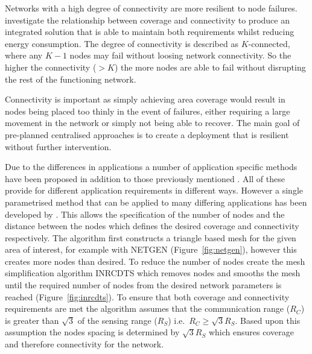 \documentclass[authoryearcitations]{UoYCSproject}
\begin{document}
Networks with a high degree of connectivity are more resilient to node failures.  investigate the relationship between coverage and connectivity to produce an integrated solution that is able to maintain both requirements whilst reducing energy consumption. The degree of connectivity is described as $K$-connected, where any $K-1$ nodes may fail without loosing network connectivity. So the higher the connectivity ($>K$) the more nodes are able to fail without disrupting the rest of the functioning network.

%

Connectivity is important as simply achieving area coverage would result in nodes being placed too thinly in the event of failures, either requiring a large movement in the network or simply not being able to recover. The main goal of pre-planned centralised approaches is to create a deployment that is resilient without further intervention.

Due to the differences in applications a number of application specific methods have been proposed in addition to those previously mentioned \citep{Meguerdichian2001,Meguerdichian2001a,Meguerdichian2003}. All of these provide for different application requirements in different ways. However a single parametrised method that can be applied to many differing applications has been developed by \citet*{Derr2013}. This allows the specification of the number of nodes and the distance between the nodes which defines the desired coverage and connectivity respectively. The algorithm first constructs a triangle based mesh for the given area of interest, for example with NETGEN (Figure~\ref{fig:netgen}), however this creates more nodes than desired. To reduce the number of nodes \citeauthor*{Derr2013} create the mesh simplification algorithm INRCDTS which removes nodes and smooths the mesh until the required number of nodes from the desired network parameters is reached (Figure~\ref{fig:inrcdts}). To ensure that both coverage and connectivity requirements are met the algorithm assumes that the communication range ($R_C$) is greater than $\sqrt{3}$ of the sensing range ($R_S$) i.e.\ $R_C \ge \sqrt{3} R_S$. Based upon this assumption the nodes spacing is determined by $\sqrt{3} R_S$ which ensures coverage and therefore connectivity for the network.
\end{document}
